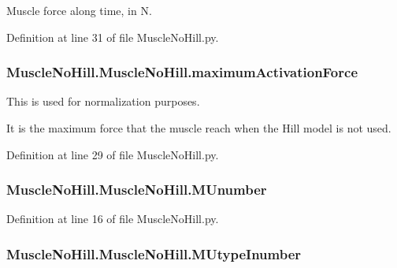 Muscle force along time, in N. 



Definition at line 31 of file Muscle\+No\+Hill.\+py.

\subsubsection[{\texorpdfstring{maximum\+Activation\+Force}{maximumActivationForce}}]{\setlength{\rightskip}{0pt plus 5cm}Muscle\+No\+Hill.\+Muscle\+No\+Hill.\+maximum\+Activation\+Force}\hypertarget{class_muscle_no_hill_1_1_muscle_no_hill_aab0ae54c579e456837c8b149a212ee5f}{}\label{class_muscle_no_hill_1_1_muscle_no_hill_aab0ae54c579e456837c8b149a212ee5f}


This is used for normalization purposes. 

It is the maximum force that the muscle reach when the Hill model is not used. 

Definition at line 29 of file Muscle\+No\+Hill.\+py.

\subsubsection[{\texorpdfstring{M\+Unumber}{MUnumber}}]{\setlength{\rightskip}{0pt plus 5cm}Muscle\+No\+Hill.\+Muscle\+No\+Hill.\+M\+Unumber}\hypertarget{class_muscle_no_hill_1_1_muscle_no_hill_ae2a6a4b782c8abea0bb581b2d133f064}{}\label{class_muscle_no_hill_1_1_muscle_no_hill_ae2a6a4b782c8abea0bb581b2d133f064}


Definition at line 16 of file Muscle\+No\+Hill.\+py.

\subsubsection[{\texorpdfstring{M\+Utype\+Inumber}{MUtypeInumber}}]{\setlength{\rightskip}{0pt plus 5cm}Muscle\+No\+Hill.\+Muscle\+No\+Hill.\+M\+Utype\+Inumber}\hypertarget{class_muscle_no_hill_1_1_muscle_no_hill_ab69c47ef7b07407562fc0b9fa65bacf0}{}\label{class_muscle_no_hill_1_1_muscle_no_hill_ab69c47ef7b07407562fc0b9fa65bacf0}


